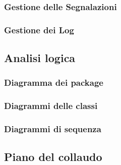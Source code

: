 \documentclass{article}
\begin{document}
\subsubsection{Gestione delle Segnalazioni}

\subsubsection{Gestione dei Log}


\subsection{Analisi logica}
\subsubsection{Diagramma dei package}

\subsubsection{Diagrammi delle classi}



\subsubsection{Diagrammi di sequenza}






\subsection{Piano del collaudo}

\end{document}
